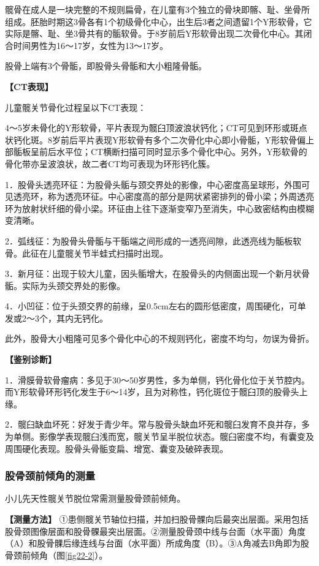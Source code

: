髋骨在成人是一块完整的不规则扁骨，在儿童有3个独立的骨块即髂、耻、坐骨所组成。胚胎时期这3骨各有1个初级骨化中心，出生后3者之间遗留1个Y形软骨，它实际是髂、耻、坐3骨共有的骺软骨。于8岁前后Y形软骨出现二次骨化中心。其闭合时间男性为16～17岁，女性为13～17岁。

股骨上端有3个骨骺，即股骨头骨骺和大小粗隆骨骺。

\textbf{【CT表现】}

儿童髋关节骨化过程呈以下CT表现：

4～5岁未骨化的Y形软骨，平片表现为髋臼顶波浪状钙化；CT可见到环形或斑点状钙化斑。8岁前后平片表现Y形软骨有多个二次骨化中心即小骨骺，Y形软骨偏上部骺板呈前后水平位；CT横断扫描可同时显示多个骨化中心。另外，Y形软骨的骨化带亦呈波浪状，故二者CT均可表现为环形钙化簇。

1．股骨头透亮环征：为股骨头骺与颈交界处的影像，中心密度高呈球形，外围可见透亮环，称为透亮环征。中心密度高的部分是网状紧密排列的骨小梁；外周透亮环为放射状纤细的骨小梁。环征由上往下逐渐变窄乃至消失，中心致密结构由模糊变清晰。

2．弧线征：为股骨头骨骺与干骺端之间形成的一透亮间隙，此透亮线为骺板软骨。此征在儿童髋关节半蛙式扫描时出现。

3．新月征：出现于较大儿童，因头骺增大，在股骨头的内侧面出现一个新月状骨骺。实际为头颈交界处的影像。

4．小凹征：位于头颈交界的前缘，呈0.5cm左右的圆形低密度，周围硬化，可单发或2～3个，其内无钙化。

此外，股骨大小粗隆可见多个骨化中心的不规则钙化，密度不均匀，勿误为骨折。

\textbf{【鉴别诊断】}

1．滑膜骨软骨瘤病：多见于30～50岁男性，多为单侧，钙化骨化位于关节腔内。而Y形软骨环形钙化发生于6～14岁，且为对称性，钙化斑位于髋臼顶的股骨头上缘。

2．髋臼缺血坏死：好发于青少年。常与股骨头缺血坏死和髋臼发育不良并存，多为单侧。影像学表现髋臼浅而宽，髋关节呈半脱位状态。髋臼密度不均，有囊变及周围硬化表现。股骨头骨骺变扁、增宽、囊变及破碎表现。

\subsubsection{股骨颈前倾角的测量}

小儿先天性髋关节脱位常需测量股骨颈前倾角。

\textbf{【测量方法】}
①患侧髋关节轴位扫描，并加扫股骨髁向后最突出层面。采用包括股骨颈图像层面和股骨髁最突出层面。②测量股骨颈中线与台面（水平面）角度（A）和股骨髁后缘连线与台面（水平面）所成角度（B）。③A角减去B角即为股骨颈前倾角（图\ref{fig22-2}）。

